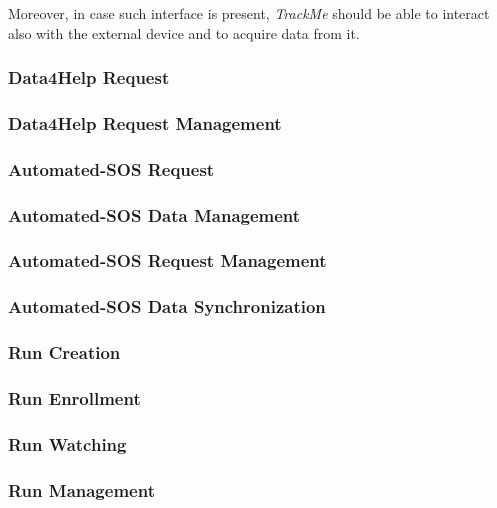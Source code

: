 \documentclass[a4paper]{article}
\begin{document}
        Moreover, in case such interface is present, \textit{TrackMe} should be able to interact also with the external device and to acquire data from it.
        
        \subsubsection{Data4Help Request}
        
        \subsubsection{Data4Help Request Management}
        
        \subsubsection{Automated-SOS Request}
        
        \subsubsection{Automated-SOS Data Management}
        
        \subsubsection{Automated-SOS Request Management}
        
        \subsubsection{Automated-SOS Data Synchronization}
        
        \subsubsection{Run Creation}
        
        \subsubsection{Run Enrollment}
        
        \subsubsection{Run Watching}
        
        \subsubsection{Run Management}
        
\end{document}
